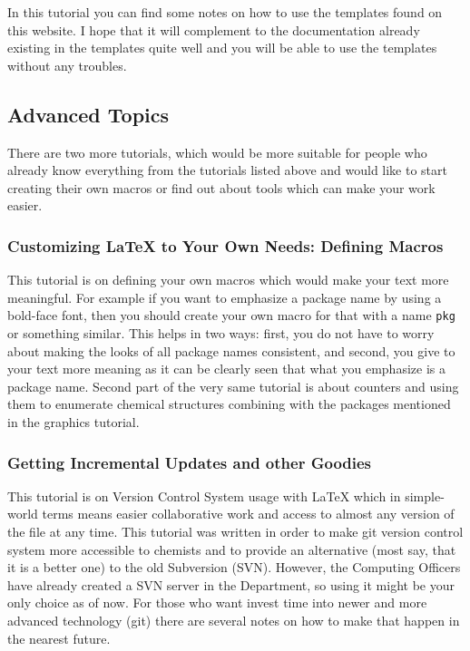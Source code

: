 \documentclass[
    draft
    ]{scrartcl}
\begin{document}
%
In this tutorial you can find some notes on how to use the templates found on
    this website.
%
I hope that it will complement to the documentation already existing in the
    templates quite well and you will be able to use the templates without any
    troubles.

%
\subsection{Advanced Topics}

%
There are two more tutorials, which would be more suitable for people who
    already know everything from the tutorials listed above and would like to
    start creating their own macros or find out about tools which can make your
    work easier.
    
%
\subsubsection{Customizing \LaTeX{} to Your Own Needs: Defining Macros}

%
This tutorial is on defining your own macros which would make your text more
    meaningful.
%
For example if you want to emphasize a package name by using a bold-face font,
    then you should create your own macro for that with a name \verb|pkg| or
    something similar.
%
This helps in two ways: first, you do not have to worry about making the looks
    of all package names consistent, and second, you give to your text more
    meaning as it can be clearly seen that what you emphasize is a package name.
%
Second part of the very same tutorial is about counters and using them to
    enumerate chemical structures combining with the packages mentioned in the
    graphics tutorial.

%
\subsubsection{Getting Incremental Updates and other Goodies}

%
This tutorial is on Version Control System usage with \LaTeX{} which in
    simple-world terms means easier collaborative work and access to almost any
    version of the file at any time.
%
This tutorial was written in order to make git version control system more
    accessible to chemists and to provide an alternative (most say, that it is a
    better one) to the old Subversion (SVN).
%
However, the Computing Officers have already created a SVN server in the
    Department, so using it might be your only choice as of now.
%
For those who want invest time into newer and more advanced technology (git)
    there are several notes on how to make that happen in the nearest future.
\end{document}
